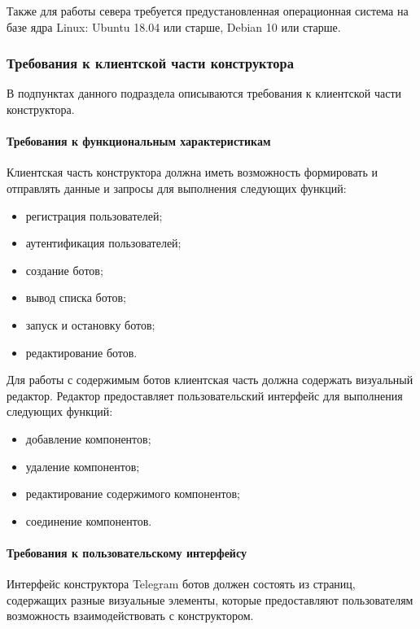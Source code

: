 Также для работы севера требуется предустановленная операционная
система на базе ядра Linux: Ubuntu 18.04 или старше, Debian 10 или старше.

\subsubsection{Требования к клиентской части конструктора}

В подпунктах данного подраздела описываются требования к клиентской части конструктора.


\paragraph{Требования к функциональным характеристикам}

Клиентская часть конструктора должна иметь возможность
формировать и отправлять данные и запросы для выполнения следующих
функций:
\begin{itemize}
	\item регистрация пользователей;
	\item аутентификация пользователей;
	\item создание ботов;
	\item вывод списка ботов;
	\item запуск и остановку ботов;
	\item редактирование ботов.
\end{itemize}

Для работы с содержимым ботов клиентская часть должна содержать
визуальный редактор. Редактор предоставляет пользовательский интерфейс
для выполнения следующих функций:
\begin{itemize}
	\item добавление компонентов;
	\item удаление компонентов;
	\item редактирование содержимого компонентов;
	\item соединение компонентов.
\end{itemize}


\paragraph{Требования к пользовательскому интерфейсу}

Интерфейс конструктора Telegram ботов должен состоять из страниц,
содержащих разные визуальные элементы, которые предоставляют
пользователям возможность взаимодействовать с конструктором.

